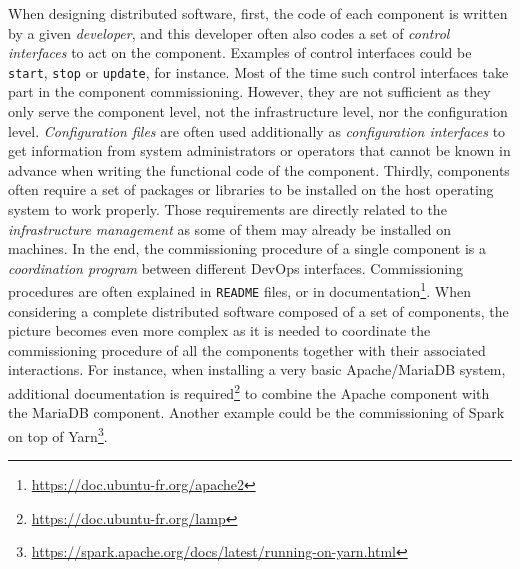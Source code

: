When designing distributed software, first, the code of each component
is written by a given \emph{developer}, and this developer often also
codes a set of \emph{control interfaces} to act on the
component. Examples of control interfaces could be \texttt{start},
\texttt{stop} or \texttt{update}, for instance. Most of the time such
control interfaces take part in the component commissioning. However,
they are not sufficient as they only serve the component level, not
the infrastructure level, nor the configuration
level. \emph{Configuration files} are often used additionally as
\emph{configuration interfaces} to get information from system
administrators or operators that cannot be known in advance when
writing the functional code of the component. Thirdly, components
often require a set of packages or libraries to be installed on the
host operating system to work properly. Those requirements are
directly related to the \emph{infrastructure management} as some of
them may already be installed on machines.
In the end, the commissioning procedure of a single component is a
\emph{coordination program} between different DevOps
interfaces. Commissioning procedures are often explained in
\texttt{README} files, or in
documentation\footnote{\url{https://doc.ubuntu-fr.org/apache2}}.
%
%
When considering a complete distributed software composed of a set of
components, the picture becomes even more complex as it is needed to
coordinate the commissioning procedure of all the components together
with their associated interactions. For instance, when installing a
very basic Apache/MariaDB system, additional documentation is
required\footnote{\url{https://doc.ubuntu-fr.org/lamp}}
to combine the Apache component with the MariaDB component. Another
example could be the commissioning of Spark on top of
Yarn\footnote{\url{https://spark.apache.org/docs/latest/running-on-yarn.html}}.


